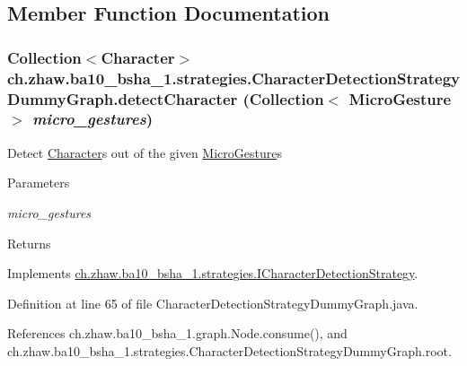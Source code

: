 \subsection{Member Function Documentation}
\hypertarget{classch_1_1zhaw_1_1ba10__bsha__1_1_1strategies_1_1CharacterDetectionStrategyDummyGraph_a6538ab532757576966ecf883ab771e32}{
\subsubsection[{detectCharacter}]{\setlength{\rightskip}{0pt plus 5cm}Collection$<${\bf Character}$>$ ch.zhaw.ba10\_\-bsha\_\-1.strategies.CharacterDetectionStrategyDummyGraph.detectCharacter (Collection$<$ {\bf MicroGesture} $>$ {\em micro\_\-gestures})}}
\label{classch_1_1zhaw_1_1ba10__bsha__1_1_1strategies_1_1CharacterDetectionStrategyDummyGraph_a6538ab532757576966ecf883ab771e32}
Detect \hyperlink{classch_1_1zhaw_1_1ba10__bsha__1_1_1Character}{Character}s out of the given \hyperlink{}{MicroGesture}s


\begin{DoxyParams}{Parameters}
\item[{\em micro\_\-gestures}]\end{DoxyParams}
\begin{DoxyReturn}{Returns}

\end{DoxyReturn}


Implements \hyperlink{interfacech_1_1zhaw_1_1ba10__bsha__1_1_1strategies_1_1ICharacterDetectionStrategy_a994429a274e75c471d18aca69dce2c1d}{ch.zhaw.ba10\_\-bsha\_\-1.strategies.ICharacterDetectionStrategy}.

Definition at line 65 of file CharacterDetectionStrategyDummyGraph.java.

References ch.zhaw.ba10\_\-bsha\_\-1.graph.Node.consume(), and ch.zhaw.ba10\_\-bsha\_\-1.strategies.CharacterDetectionStrategyDummyGraph.root.

